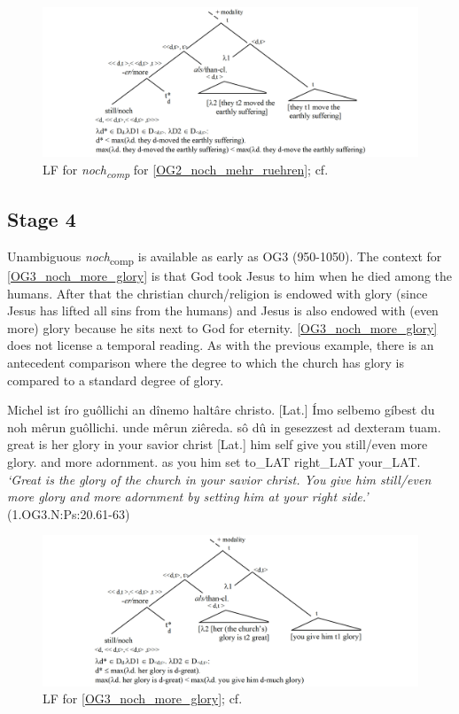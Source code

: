 \documentclass[output=paper,
modfonts
]{langscibook}
\begin{document}
\begin{figure}
\includegraphics[width=1\textwidth]{figures/LF2_comp}
\caption{LF for \textit{noch\textsubscript{comp}} for \ref{OG2_noch_mehr_ruehren}; cf. \citep{beck2016a_sub}}
\label{fig:LF2_comp}
\end{figure}

\subsection{Stage 4} Unambiguous \textit{noch}\textsubscript{comp} is available as early as OG3 (950-1050). The context for \ref{OG3_noch_more_glory} is that God took Jesus to him when he died among the humans. After that the christian church/religion is endowed with glory (since Jesus has lifted all sins from the humans) and Jesus is also endowed with (even more) glory because he sits next to God for eternity. \ref{OG3_noch_more_glory} does not license a temporal reading. As with the previous example, there is an antecedent comparison where the degree to which the church has glory is compared to a standard degree of glory.

\ea\gll Michel ist íro guôllichi an dînemo haltâre christo. [Lat.] Ímo selbemo gíbest du noh mêrun guôllichi. unde mêrun ziêreda. sô dû in gesezzest ad dexteram tuam.\\
       great is her glory in your savior christ [Lat.] him self give you still/even more glory. and more adornment. as you him set to\_LAT right\_LAT your\_LAT.\\
\glt   \textit{`Great is the glory of the church in your savior christ. You give him still/even more glory and more adornment by setting him at your right side.'}\label{OG3_noch_more_glory} \\ \flushright \vspace{-24pt} (1.OG3.N:Ps:20.61-63)
\z

\begin{figure}
\includegraphics[width=1\textwidth]{figures/LF3_comp}
\caption{LF for \ref{OG3_noch_more_glory}; cf. \citep{beck2016a_sub}}
\label{fig:LF3_comp}
\end{figure}
\end{document}
